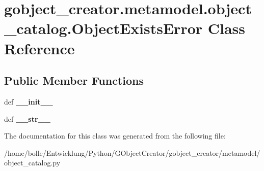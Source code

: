 \hypertarget{classgobject__creator_1_1metamodel_1_1object__catalog_1_1ObjectExistsError}{
\section{gobject\_\-creator.metamodel.object\_\-catalog.ObjectExistsError Class Reference}
\label{classgobject__creator_1_1metamodel_1_1object__catalog_1_1ObjectExistsError}
}
\subsection*{Public Member Functions}
\begin{DoxyCompactItemize}
\item 
\hypertarget{classgobject__creator_1_1metamodel_1_1object__catalog_1_1ObjectExistsError_ac0ae27ebe51b2f7baae67b6d782f8344}{
def {\bfseries \_\-\_\-init\_\-\_\-}}
\label{classgobject__creator_1_1metamodel_1_1object__catalog_1_1ObjectExistsError_ac0ae27ebe51b2f7baae67b6d782f8344}

\item 
\hypertarget{classgobject__creator_1_1metamodel_1_1object__catalog_1_1ObjectExistsError_a7f01954501b7a820c08385fe21176bc6}{
def {\bfseries \_\-\_\-str\_\-\_\-}}
\label{classgobject__creator_1_1metamodel_1_1object__catalog_1_1ObjectExistsError_a7f01954501b7a820c08385fe21176bc6}

\end{DoxyCompactItemize}


The documentation for this class was generated from the following file:\begin{DoxyCompactItemize}
\item 
/home/bolle/Entwicklung/Python/GObjectCreator/gobject\_\-creator/metamodel/object\_\-catalog.py\end{DoxyCompactItemize}
